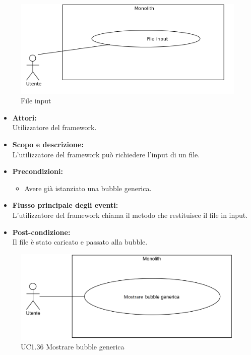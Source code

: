 
\begin{figure}[H]
	\centering
	\includegraphics[width=15cm]{../../documenti/AnalisiDeiRequisiti/Diagrammi_img/uc1_34.png}
	\caption{\UCCaption{} File input}
\end{figure}

\begin{itemize}
	\item \textbf{Attori:}
	\\Utilizzatore del framework.
	\item \textbf{Scopo e descrizione:} 
	\\L'utilizzatore del framework può richiedere l'input di un file.
	\item \textbf{Precondizioni:}
	\begin{itemize}
		\item Avere già istanziato una bubble generica.
	\end{itemize}
	\item \textbf{Flusso principale degli eventi:}
	\\L'utilizzatore del framework chiama il metodo che restituisce il file in input.
	\item \textbf{Post-condizione:}
	\\Il file è stato caricato e passato alla bubble.
\end{itemize}


\begin{figure}[H]
	\centering
	\includegraphics[width=15cm]{../../documenti/AnalisiDeiRequisiti/Diagrammi_img/uc1_36.png}
	\caption{UC1.36 Mostrare bubble generica}
\end{figure}

